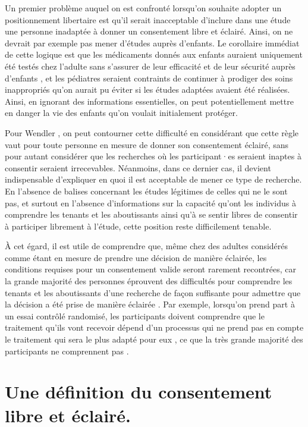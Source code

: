 \documentclass[
  12pt,
]{book}
\begin{document}
Un premier problème auquel on est confronté lorsqu'on souhaite adopter un positionnement libertaire est qu'il serait inacceptable d'inclure dans une étude une personne inadaptée à donner un consentement libre et éclairé. Ainsi, on ne devrait par exemple pas mener d'études auprès d'enfants. Le corollaire immédiat de cette logique est que les médicaments donnés aux enfants auraient uniquement été testés chez l'adulte sans s'assurer de leur efficacité et de leur sécurité auprès d'enfants \citep{Roberts2003, Field2004-an, Caldwell2004, Smith2008}, et les pédiatres seraient contraints de continuer à prodiger des soins inappropriés qu'on aurait pu éviter si les études adaptées avaient été réalisées. Ainsi, en ignorant des informations essentielles, on peut potentiellement mettre en danger la vie des enfants qu'on voulait initialement protéger.

Pour Wendler \citeyearpar{sep-clinical-research}, on peut contourner cette difficulté en considérant que cette règle vaut pour toute personne en mesure de donner son consentement éclairé, sans pour autant considérer que les recherches où les participant·es seraient inaptes à consentir seraient irrecevables. Néanmoins, dans ce dernier cas, il devient indispensable d'expliquer en quoi il est acceptable de mener ce type de recherche. En l'absence de balises concernant les études légitimes de celles qui ne le sont pas, et surtout en l'absence d'informations sur la capacité qu'ont les individus à comprendre les tenants et les aboutissants ainsi qu'à se sentir libres de consentir à participer librement à l'étude, cette position reste difficilement tenable.

À cet égard, il est utile de comprendre que, même chez des adultes considérés comme étant en mesure de prendre une décision de manière éclairée, les conditions requises pour un consentement valide seront rarement recontrées, car la grande majorité des personnes éprouvent des difficultés pour comprendre les tenants et les aboutissants d'une recherche de façon suffisante pour admettre que la décision a été prise de manière éclairée \citep{Flory2004}. Par exemple, lorsqu'on prend part à un essai contrôlé randomisé, les participants doivent comprendre que le traitement qu'ils vont recevoir dépend d'un processus qui ne prend pas en compte le traitement qui sera le plus adapté pour eux \citep{Kupst2003}, ce que la très grande majorité des participants ne comprennent pas \citep{SNOWDON1997, Appelbaum2004}.

\section{Une définition du consentement libre et éclairé.}\label{une-duxe9finition-du-consentement-libre-et-uxe9clairuxe9.}
\end{document}

